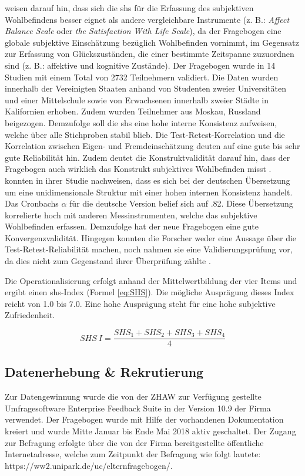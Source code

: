  weisen darauf hin, dass sich die \acrshort{shs} für die Erfassung des subjektiven Wohlbefindens besser eignet als andere vergleichbare Instrumente (z. B.: \textit{Affect Balance Scale} oder \textit{the Satisfaction With Life Scale}), da der Fragebogen eine globale subjektive Einschätzung bezüglich Wohlbefinden vornimmt, im Gegensatz zur Erfassung von Glückszuständen, die einer bestimmte Zeitspanne zuzuordnen sind (z. B.: affektive und kognitive Zustände). Der Fragebogen wurde in 14 Studien mit einem Total von 2732 Teilnehmern validiert. Die Daten wurden innerhalb der Vereinigten Staaten anhand von Studenten zweier Universitäten und einer Mittelschule sowie von Erwachsenen innerhalb zweier Städte in Kalifornien erhoben. Zudem wurden Teilnehmer aus Moskau, Russland beigezogen. Demzufolge soll die \acrshort{shs} eine hohe interne Konsistenz aufweisen, welche über alle Stichproben stabil blieb. Die Test-Retest-Korrelation und die Korrelation zwischen Eigen- und Fremdeinschätzung deuten auf eine gute bis sehr gute Reliabilität hin.  
Zudem deutet die Konstruktvalidität darauf hin, dass der Fragebogen auch wirklich das Konstrukt subjektives Wohlbefinden misst \cite{Lyubomirsky1999}.  konnten in ihrer Studie nachweisen, dass es sich bei der deutschen Übersetzung um eine unidimensionale Struktur mit einer hohen internen Konsistenz handelt. Das Cronbachs $\alpha$ für die deutsche Version belief sich auf .82. Diese Übersetzung korrelierte hoch mit anderen Messinstrumenten, welche das subjektive Wohlbefinden erfassen. Demzufolge hat der neue Fragebogen eine gute Konvergenzvalidität. Hingegen konnten die Forscher weder eine Aussage über die Test-Retest-Reliabilität machen, noch nahmen sie eine Validierungsprüfung vor, da dies nicht zum Gegenstand ihrer Überprüfung zählte \cite{Swami2009}.

Die Operationalisierung erfolgt anhand der Mittelwertbildung der vier Items \cite{Lyubomirsky1999} und ergibt einen \acrshort{shs}-Index (Formel \ref{eq:SHS}). Die mögliche Ausprägung dieses Index reicht von 1.0 bis 7.0. Eine hohe Ausprägung steht für eine hohe subjektive Zufriedenheit.

\begin{equation}\label{eq:SHS}
    SHS~I=\frac{SHS_{1}+SHS_{2}+SHS_{3}+SHS_{4}}{4}
\end{equation}

\subsection{Datenerhebung \& Rekrutierung}\label{sec:Datenerhebung}
Zur Datengewinnung wurde die von der ZHAW zur Verfügung gestellte Umfragesoftware Enterprise Feedback Suite in der Version 10.9 der Firma  verwendet. Der Fragebogen wurde mit Hilfe der vorhandenen Dokumentation kreiert \cite{EFS2016} und wurde Mitte Januar bis Ende Mai 2018 aktiv geschaltet.  Der Zugang zur Befragung erfolgte über die von der Firma  bereitgestellte öffentliche Internetadresse, welche zum Zeitpunkt der Befragung wie folgt lautete: https://ww2.unipark.de/uc/elternfragebogen/.

